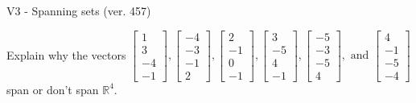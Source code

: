 \begin{exercise}
  \begin{exerciseTitle}V3 - Spanning sets (ver. 457)\end{exerciseTitle}
  \begin{exerciseStatement}
    Explain why the vectors \(\left[\begin{array}{r}
1 \\
3 \\
-4 \\
-1
\end{array}\right] , \left[\begin{array}{r}
-4 \\
-3 \\
-1 \\
2
\end{array}\right] , \left[\begin{array}{r}
2 \\
-1 \\
0 \\
-1
\end{array}\right] , \left[\begin{array}{r}
3 \\
-5 \\
4 \\
-1
\end{array}\right] , \left[\begin{array}{r}
-5 \\
-3 \\
-5 \\
4
\end{array}\right] , \text{ and } \left[\begin{array}{r}
4 \\
-1 \\
-5 \\
-4
\end{array}\right]\) span or don't span \(\mathbb{R}^4\). 
	



\end{exerciseStatement}
\end{exercise}
